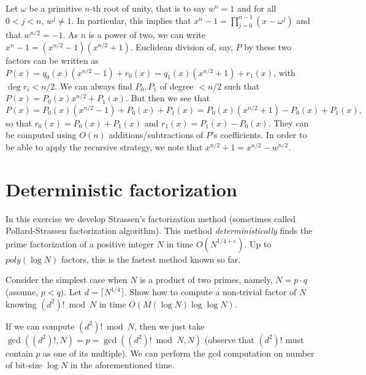 \documentclass[11pt]{exam}
\theoremstyle{definition}
\begin{document}
{\begin{questions}
\begin{solution}
    Let $\omega$ be a primitive $n$-th root of unity, that is to say $w^n=1$ and for all $0<j<n$, $w^j\neq 1$. In particular, this implies that $x^n-1=\prod_{j=0}^{n-1}(x-\omega^j)$ and that $w^{n/2}=-1$. As $n$ is a power of two, we can write $x^n-1=(x^{n/2}-1)(x^{n/2}+1)$. Euclidean division of, say, $P$ by these two factors can be written as $P(x) = q_0(x)(x^{n/2}-1)+r_0(x) = q_1(x)(x^{n/2}+1)+r_1(x)$, with $\deg r_i < n/2$. We can always find $P_0, P_1$ of degree $< n/2$ such that $P(x) = P_0(x)x^{n/2}+P_1(x)$. But then we see that
    $$ P(x) = P_0(x)(x^{n/2}-1)+P_0(x)+P_1(x)=P_0(x)(x^{n/2}+1)-P_0(x)+P_1(x),$$
so that $r_0(x) = P_0(x)+P_1(x)$ and $r_1(x)=P_1(x)-P_0(x)$. They can be computed using $O(n)$ additions/subtractions of $P$'s coefficients. In order to be able to apply the recursive strategy, we note that $x^{n/2}+1 = x^{n/2}-w^{n/2}.$
    
    
  \end{solution}
\end{questions}

\section{Deterministic factorization}

In this exercise we develop Strassen's factorization method (sometimes called Pollard-Strassen factorization algorithm). This method \emph{deterministically} finds the prime factorization of a positive integer $N$  in time $O(N^{1/4 + \varepsilon})$. Up to $poly(\log N)$ factors, this is the fastest method known so far.

\begin{questions}
  \question Consider the simplest case when $N$ is a product of two primes, namely, $N=p \cdot q$ (assume, $p < q$). Let $d = \lceil N^{1/4}\rceil$. Show how to compute a non-trivial factor of $N$ knowing $(d^2)!\bmod N$ in time $O(M(\log N) \log\log N)$.
  
  \begin{solution}
    If we can compute $(d^2)! \bmod N$, then we just take $\gcd((d^2)!, N) = p = \gcd((d^2)! \bmod N, N)$ (observe that $(d^2)!$ must contain $p$ as one of its multiple). We can perform the gcd computation on number of bit-size $\log N$ in the aforementioned time.
  \end{solution}
  

\end{questions}}
\end{document}
